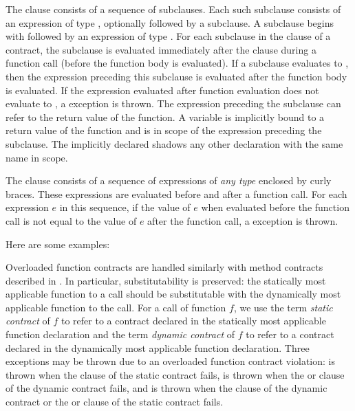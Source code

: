 The  clause consists of a sequence of
 subclauses. Each such subclause consists of an
expression of type ,
optionally followed by
a  subclause. A  subclause begins with
 followed by an expression of type
.  For each subclause in the  clause of a
contract, the 
subclause is evaluated immediately after the  clause during a
function call (before the function body is evaluated).
If a  subclause evaluates to ,
then the expression preceding this  subclause is evaluated
after the function body is evaluated.
If the expression evaluated after function evaluation does
not evaluate to , a  exception is thrown.
The expression preceding the  subclause can refer to
the return value of the function.
A  variable is implicitly bound to a return value of the
function and is in scope of
the expression preceding the  subclause.
The implicitly declared  shadows any other declaration with the
same name in scope.

The  clause consists of a sequence of expressions of
\emph{any type} enclosed by curly braces.
These expressions are evaluated before and after a function call.  For
each expression $e$ in this sequence, if the value of $e$ when evaluated
before the function call is not equal to the value of $e$ after
the function call,  a  exception is thrown.

Here are some examples:


Overloaded function contracts are handled similarly with method contracts
described in .  In particular, substitutability is
preserved: the statically most applicable function to a call should be
substitutable with the dynamically most applicable function to the call.
For a call of function $f$,
we use the term \emph{static contract} of $f$ to refer to
a contract declared in the statically most applicable function declaration
and the term \emph{dynamic contract} of $f$ to refer to a contract declared
in the dynamically most applicable function declaration.
Three exceptions may be thrown due to an overloaded function contract
violation:  is thrown when the  clause
of the static contract fails,  is thrown when the
 or  clause of the dynamic contract fails,
and  is thrown
when the  clause of the dynamic contract
or the  or  clause of the static contract fails.


